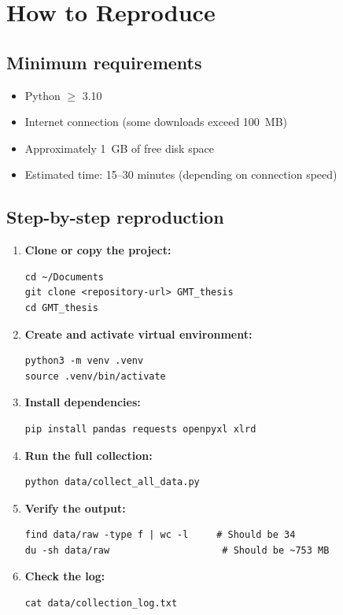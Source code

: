 \documentclass[12pt,a4paper]{article}
\begin{document}
\section{How to Reproduce}\label{sec:reproduce}

\subsection{Minimum requirements}

\begin{itemize}
    \item Python $\geq$ 3.10
    \item Internet connection (some downloads exceed 100~MB)
    \item Approximately 1~GB of free disk space
    \item Estimated time: 15--30 minutes (depending on connection speed)
\end{itemize}

\subsection{Step-by-step reproduction}

\begin{enumerate}
\item \textbf{Clone or copy the project:}
\begin{lstlisting}[style=shellstyle]
cd ~/Documents
git clone <repository-url> GMT_thesis
cd GMT_thesis
\end{lstlisting}

\item \textbf{Create and activate virtual environment:}
\begin{lstlisting}[style=shellstyle]
python3 -m venv .venv
source .venv/bin/activate
\end{lstlisting}

\item \textbf{Install dependencies:}
\begin{lstlisting}[style=shellstyle]
pip install pandas requests openpyxl xlrd
\end{lstlisting}

\item \textbf{Run the full collection:}
\begin{lstlisting}[style=shellstyle]
python data/collect_all_data.py
\end{lstlisting}

\item \textbf{Verify the output:}
\begin{lstlisting}[style=shellstyle]
find data/raw -type f | wc -l     # Should be 34
du -sh data/raw                    # Should be ~753 MB
\end{lstlisting}

\item \textbf{Check the log:}
\begin{lstlisting}[style=shellstyle]
cat data/collection_log.txt
\end{lstlisting}
\end{enumerate}
\end{document}
